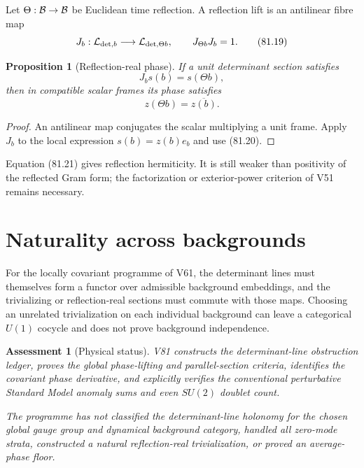 \documentclass[11pt]{article}
\newtheorem{proposition}[theorem]{Proposition}
\newtheorem{assessment}[theorem]{Assessment}
\theoremstyle{remark}
\begin{document}
Let \(\Theta:{\cal B}\to{\cal B}\) be Euclidean time reflection.  A
reflection lift is an antilinear fibre map
\[
 J_b:{\cal L}_{{\rm det},b}
 \longrightarrow{\cal L}_{{\rm det},\Theta b},\qquad
 J_{\Theta b}J_b=1.                                   \tag{81.19}
\]

\begin{proposition}[Reflection-real phase]
\label{prop:v15v81-real}
If a unit determinant section satisfies
\[
 J_bs(b)=s(\Theta b),                                 \tag{81.20}
\]
then in compatible scalar frames its phase satisfies
\[
 z(\Theta b)=\overline{z(b)}.                         \tag{81.21}
\]
\end{proposition}

\begin{proof}
An antilinear map conjugates the scalar multiplying a unit frame.
Apply \(J_b\) to the local expression \(s(b)=z(b)e_b\) and use
(81.20).
\end{proof}

Equation (81.21) gives reflection hermiticity.  It is still weaker
than positivity of the reflected Gram form; the factorization or
exterior-power criterion of V51 remains necessary.

\section{Naturality across backgrounds}

For the locally covariant programme of V61, the determinant lines
must themselves form a functor over admissible background
embeddings, and the trivializing or reflection-real sections must
commute with those maps.  Choosing an unrelated trivialization on
each individual background can leave a categorical \(U(1)\)
cocycle and does not prove background independence.

\begin{assessment}[Physical status]
\label{ass:v15v81-status}
V81 constructs the determinant-line obstruction ledger, proves the
global phase-lifting and parallel-section criteria, identifies the
covariant phase derivative, and explicitly verifies the
conventional perturbative Standard Model anomaly sums and even
\(SU(2)\) doublet count.

The programme has not classified the determinant-line holonomy for
the chosen global gauge group and dynamical background category,
handled all zero-mode strata, constructed a natural
reflection-real trivialization, or proved an average-phase floor.
\end{assessment}
\end{document}
